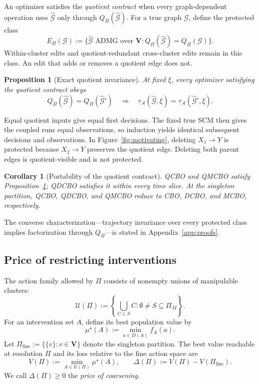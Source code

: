 \documentclass[twoside]{article}
\newtheorem{proposition}{Proposition}
\newtheorem{corollary}{Corollary}
\newcommand{\Gg}{\mathcal{G}}
\begin{document}
An optimizer satisfies the \emph{quotient contract} when every graph-dependent operation uses \(\widehat{\Gg}\) only through \(Q_\Pi(\widehat{\Gg})\). For a true graph \(\Gg\), define the protected class
\begin{equation}
 E_\Pi(\Gg):=
 \{\widehat{\Gg}\text{ ADMG over }\mathbf V:
 Q_\Pi(\widehat{\Gg})=Q_\Pi(\Gg)\}.
 \label{eq:protected-class}
\end{equation}
Within-cluster edits and quotient-redundant cross-cluster edits remain in this class. An edit that adds or removes a quotient edge does not.

\begin{proposition}[Exact quotient invariance]
\label{prop:contract}
At fixed \(\xi\), every optimizer satisfying the quotient contract obeys
\[
 Q_\Pi(\widehat{\Gg})=Q_\Pi(\widehat{\Gg}')
 \quad\Longrightarrow\quad
 \tau_{\mathcal A}(\widehat{\Gg},\xi)
 =\tau_{\mathcal A}(\widehat{\Gg}',\xi).
\]
\end{proposition}

Equal quotient inputs give equal first decisions. The fixed true SCM then gives the coupled runs equal observations, so induction yields identical subsequent decisions and observations. In Figure~\ref{fig:motivating}, deleting \(X_1\to Y\) is protected because \(X_2\to Y\) preserves the quotient edge. Deleting both parent edges is quotient-visible and is not protected.

\begin{corollary}[Portability of the quotient contract]
\label{cor:portability}
QCBO and QMCBO satisfy Proposition~\ref{prop:contract}; QDCBO satisfies it within every time slice. At the singleton partition, QCBO, QDCBO, and QMCBO reduce to CBO, DCBO, and MCBO, respectively.
\end{corollary}

The converse characterization---trajectory invariance over every protected class implies factorization through \(Q_\Pi\)---is stated in Appendix~\ref{app:proofs}.

\subsection{Price of restricting interventions}
\label{sec:price}

The action family allowed by \(\Pi\) consists of nonempty unions of manipulable clusters:
\begin{equation}
 \mathcal U(\Pi):=
 \left\{\bigcup_{C\in S}C:
 \emptyset\ne S\subseteq\Pi_M\right\}.
 \label{eq:cluster-actions}
\end{equation}
For an intervention set \(A\), define its best population value by
\[
 \mu^\star(A):=\min_{a\in D(A)}f_A(a).
\]
Let \(\Pi_{\mathrm{fine}}:=\{\{v\}:v\in\mathbf V\}\) denote the singleton partition. The best value reachable at resolution \(\Pi\) and its loss relative to the fine action space are
\begin{equation}
 V(\Pi):=\min_{A\in\mathcal U(\Pi)}\mu^\star(A),
 \qquad
 \Delta(\Pi):=V(\Pi)-V(\Pi_{\mathrm{fine}}).
 \label{eq:price}
\end{equation}
We call \(\Delta(\Pi)\ge0\) the \emph{price of coarsening}.
\end{document}
